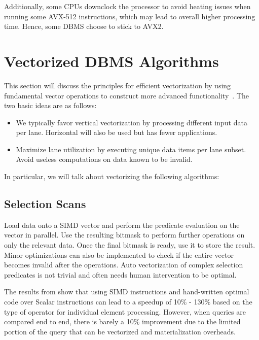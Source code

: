 \documentclass[11pt]{article}
\begin{document}
Additionally, some CPUs downclock \cite{10.1145/3211922.3211928} the processor to avoid heating issues when running some AVX-512 instructions, which may lead to overall higher processing time. Hence, some DBMS choose to stick to AVX2.


\section{Vectorized DBMS Algorithms} 
\label{algo}
This section will discuss the principles for efficient vectorization by using fundamental vector operations to construct more advanced functionality~\cite{Polychroniou2015}. The two basic ideas are as follows:
\begin{itemize}
    \item We typically favor vertical vectorization by processing different input data per lane. Horizontal will also be used but has fewer applications.
    \item Maximize lane utilization by executing unique data items per lane subset. Avoid useless computations on data known to be invalid.
\end{itemize} 

In particular, we will talk about vectorizing the following algorithms:

\subsection{Selection Scans}
Load data onto a SIMD vector and perform the predicate evaluation on the vector in parallel. Use the resulting bitmask to perform further operations on only the relevant data. Once the final bitmask is ready, use it to store the result. Minor optimizations can also be implemented to check if the entire vector becomes invalid after the operations. Auto vectorization of complex selection predicates is not trivial and often needs human intervention to be optimal.

The results from \cite{10.14778/3275366.3284966} show that using SIMD instructions and hand-written optimal code over Scalar instructions can lead to a speedup of 10\% - 130\%  based on the type of operator for individual element processing. However, when queries are compared end to end, there is barely a 10\% improvement due to the limited portion of the query that can be vectorized and materialization overheads.
\end{document}
